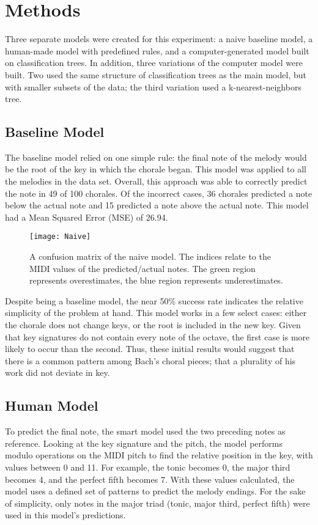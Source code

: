 \documentclass[12pt]{article}
\begin{document}
\section{Methods}
Three separate models were created for this experiment: a naive baseline model, a human-made model with predefined rules, and a computer-generated model built on classification trees. In addition, three variations of the computer model were built. Two used the same structure of classification trees as the main model, but with smaller subsets of the data; the third variation used a k-nearest-neighbors tree.

\subsection{Baseline Model}
The baseline model relied on one simple rule: the final note of the melody would be the root of the key in which the chorale began. This model was applied to all the melodies in the data set. Overall, this approach was able to correctly predict the note in 49 of 100 chorales. Of the incorrect cases, 36 chorales predicted a note below the actual note and 15 predicted a note above the actual note. This model had a Mean Squared Error (MSE) of 26.94.\\

\begin{figure}[h]
  \texttt{[image: Naive]}
  \centering
  \caption{A confusion matrix of the naive model. The indices relate to the MIDI values of the predicted/actual notes. The green region represents overestimates, the blue region represents underestimates.}
\end{figure}

Despite being a baseline model, the near 50\% success rate indicates the relative simplicity of the problem at hand. This model works in a few select cases: either the chorale does not change keys, or the root is included in the new key. Given that key signatures do not contain every note of the octave, the first case is more likely to occur than the second. Thus, these initial results would suggest that there is a common pattern among Bach's choral pieces; that a plurality of his work did not deviate in key.

\subsection{Human Model}
To predict the final note, the smart model used the two preceding notes as reference. Looking at the key signature and the pitch, the model performs modulo operations on the MIDI pitch to find the relative position in the key, with values between 0 and 11. For example, the tonic becomes 0, the major third becomes 4, and the perfect fifth becomes 7. With these values calculated, the model uses a defined set of patterns to predict the melody endings. For the sake of simplicity, only notes in the major triad (tonic, major third, perfect fifth) were used in this model's predictions.\\
\end{document}
